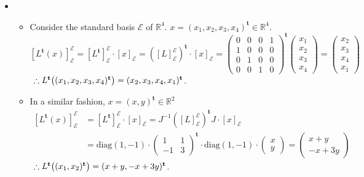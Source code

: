 \documentclass[12pt]{report}
\newcommand{\numl}[1]{\item[\large\textbf{\sffamily #1}]}
\newcommand{\num}[1]{\item[\textbf{\sffamily #1}]}
\newcommand{\mc}[1]{\mathcal{#1}}
\newcommand{\bb}[1]{\mathbb{#1}}
\newcommand{\trans}{^{\mathrm{\mathbf{t}}}}
\newcommand{\inv}{^{-1}}
\newcommand{\diag}{\text{diag}}
\renewcommand{\inv}{^{-1}}
\begin{document}
\begin{itemize}
\numl{13.9.6} 
	\begin{itemize}
		\num{(가)} Consider the standard basis $\mc{E}$ of $\bb{R}^4$. $x = (x_1, x_2, x_3, x_4)\trans \in \bb{R}^4$. $$[L\trans (x)]_\mc{E}^\mc{E}= [L\trans] ^\mc{E}_\mc{E} \cdot [x]_\mc{E}= \left([L]^\mc{E}_\mc{E}\right)\trans \cdot [x]_\mc{E}= \begin{pmatrix}
		0 & 0 & 0 & 1 \\ 1 & 0 & 0 & 0\\
		0 & 1 & 0 & 0 \\ 0 & 0 & 1 & 0
		\end{pmatrix}\trans \begin{pmatrix}
		x_1\\x_2\\x_3\\x_4
		\end{pmatrix} = \begin{pmatrix}
		x_2\\x_3\\x_4\\x_1
		\end{pmatrix}$$
		$~\hfill \therefore L\trans\big((x_1, x_2, x_3, x_4)\trans\big) = (x_2, x_3, x_4, x_1)\trans$.
		\num{(나)} In a similar fashion, $x = (x, y)\trans \in \bb{R}^2$ $$\begin{aligned}
			[L\trans (x)]_\mc{E}^\mc{E}&= [L\trans] ^\mc{E}_\mc{E} \cdot [x]_\mc{E}= J\inv \left([L]^\mc{E}_\mc{E}\right)\trans J \cdot [x]_\mc{E} \\&= \diag(1, -1)\cdot \begin{pmatrix}
			1&1\\-1&3
			\end{pmatrix}\trans \cdot \diag(1, -1) \cdot \begin{pmatrix}
			x \\ y
			\end{pmatrix} = \begin{pmatrix}
				x + y\\-x +3y
			\end{pmatrix}
		\end{aligned}$$
		$~\hfill \therefore L\trans\big((x_1, x_2)\trans\big) = (x +y, -x + 3y)\trans$.
	\end{itemize}      
\end{itemize}
\end{document}
